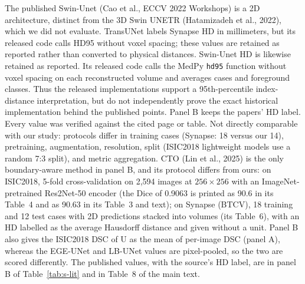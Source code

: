 \documentclass[10pt]{article}
\makeatletter
\renewcommand\paragraph{\@startsection{paragraph}{4}{\z@}{1.6ex \@plus .5ex \@minus .2ex}{-1em}{\normalfont\normalsize\bfseries}}
\makeatother
\begin{document}
\paragraph{Published results.} The published Swin-Unet (Cao et al., ECCV 2022 Workshops) is a 2D architecture, distinct from the 3D Swin UNETR (Hatamizadeh et al., 2022), which we did not evaluate. TransUNet labels Synapse HD in millimeters, but its released code calls HD95 without voxel spacing; these values are retained as reported rather than converted to physical distances. Swin-Unet HD is likewise retained as reported. Its released code calls the MedPy \texttt{hd95} function without voxel spacing on each reconstructed volume and averages cases and foreground classes. Thus the released implementations support a 95th-percentile index-distance interpretation, but do not independently prove the exact historical implementation behind the published points. Panel B keeps the papers' HD label. Every value was verified against the cited page or table. Not directly comparable with our study: protocols differ in training cases (Synapse: 18 versus our 14), pretraining, augmentation, resolution, split (ISIC2018 lightweight models use a random 7:3 split), and metric aggregation. CTO (Lin et al., 2025) is the only boundary-aware method in panel B, and its protocol differs from ours: on ISIC2018, 5-fold cross-validation on 2,594 images at $256\times256$ with an ImageNet-pretrained Res2Net-50 encoder (the Dice of 0.9063 is printed as 90.6 in its Table~4 and as 90.63 in its Table~3 and text); on Synapse (BTCV), 18 training and 12 test cases with 2D predictions stacked into volumes (its Table~6), with an HD labelled as the average Hausdorff distance and given without a unit. Panel B also gives the ISIC2018 DSC of U as the mean of per-image DSC (panel A), whereas the EGE-UNet and LB-UNet values are pixel-pooled, so the two are scored differently. The published values, with the source's HD label, are in panel B of Table~\ref{tab:s-lit} and in Table~8 of the main text.
\end{document}
